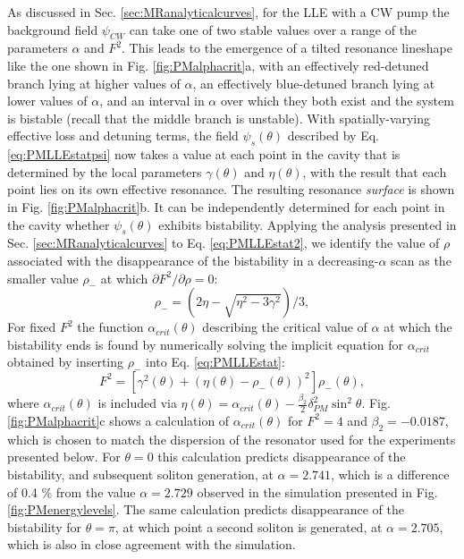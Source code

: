 As discussed in Sec. \ref{sec:MRanalyticalcurves}, for the LLE with a CW pump the background field $\psi_{CW}$ can take one of two stable values over a range of the parameters $\alpha$ and $F^2$. This leads to the emergence of a tilted resonance lineshape like the one shown in Fig. \ref{fig:PMalphacrit}a, with an effectively red-detuned branch lying at higher values of $\alpha$, an effectively blue-detuned branch lying at lower values of $\alpha$, and an interval in $\alpha$ over which they both exist and the system is bistable (recall that the middle branch is unstable). With spatially-varying effective loss and detuning terms, the field $\psi_s(\theta)$ described by Eq. \ref{eq:PMLLEstatpsi} now takes a value at each point in the cavity that is determined by the local parameters $\gamma(\theta)$ and $\eta(\theta)$, with the result that each point lies on its own effective resonance. The resulting resonance \textit{surface} is shown in Fig. \ref{fig:PMalphacrit}b. It can be independently determined for each point in the cavity whether $\psi_s(\theta)$ exhibits bistability. Applying the analysis presented in Sec. \ref{sec:MRanalyticalcurves} to Eq. \ref{eq:PMLLEstat2}, we identify the value of $\rho$ associated with the disappearance of the bistability in a decreasing-$\alpha$ scan as the smaller value $\rho_-$ at which $\partial F^2/\partial\rho=0$:
\begin{equation}
\rho_-=\left(2\eta-\sqrt{\eta^2-3\gamma^2}\right)/3,
\end{equation}
For fixed $F^2$ the function $\alpha_{crit}(\theta)$ describing the critical value of $\alpha$ at which the bistability ends is found by numerically solving the implicit equation for $\alpha_{crit}$ obtained by inserting $\rho_-$ into Eq. \ref{eq:PMLLEstat}:
\begin{equation}
F^2=\left[\gamma^2(\theta)+\left(\eta(\theta)-\rho_-(\theta)\right)^2\right]\rho_-(\theta),
\end{equation}
where $\alpha_{crit}(\theta)$ is included via $\eta(\theta)=\alpha_{crit}(\theta)-\frac{\beta_2}{2}\delta_{PM}^2\sin^2{\theta}$. Fig. \ref{fig:PMalphacrit}c shows a calculation of $\alpha_{crit}(\theta)$ for $F^2=4$ and $\beta_2=-0.0187$, which is chosen to match the dispersion of the resonator used for the experiments presented below. For $\theta=0$ this calculation predicts disappearance of the bistability, and subsequent soliton generation, at $\alpha=2.741$, which is a difference of 0.4 \% from the value $\alpha=2.729$ observed in the simulation presented in Fig. \ref{fig:PMenergylevels}. The same calculation predicts disappearance of the bistability for $\theta=\pi$, at which point a second soliton is generated, at $\alpha=2.705$, which is also in close agreement with the simulation.



